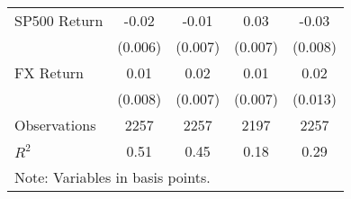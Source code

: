 \begin{table}[htbp]
\begin{tabular*}{0.8\hsize}{@{\hskip\tabcolsep\extracolsep\fill}l*{4}{c}}
\addlinespace
SP500 Return        &       -0.02\sym{**} &       -0.01         &        0.03\sym{**} &       -0.03\sym{**} \\
                    &     (0.006)         &     (0.007)         &     (0.007)         &     (0.008)         \\
\addlinespace
FX Return           &        0.01         &        0.02\sym{*}  &        0.01         &        0.02         \\
                    &     (0.008)         &     (0.007)         &     (0.007)         &     (0.013)         \\
\midrule
Observations        &        2257         &        2257         &        2197         &        2257         \\
\(R^{2}\)           &        0.51         &        0.45         &        0.18         &        0.29         \\
\bottomrule
\multicolumn{5}{l}{\footnotesize Note: Variables in basis points.}\\
\end{tabular*}
\end{table}
